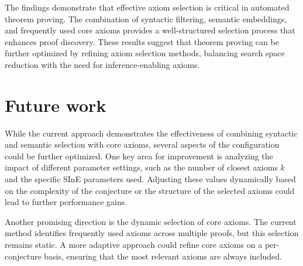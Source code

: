\documentclass[english,version-2020-11]{uzl-thesis}
\begin{document}
The findings demonstrate that effective axiom selection is critical in automated theorem proving. The combination of syntactic filtering, semantic embeddings, and frequently used core axioms provides a well-structured selection process that enhances proof discovery. These results suggest that theorem proving can be further optimized by refining axiom selection methods, balancing search space reduction with the need for inference-enabling axioms.

\chapter{Future work}
\label{chapter-futerwork}

While the current approach demonstrates the effectiveness of combining syntactic and semantic selection with core axioms, several aspects of the configuration could be further optimized. One key area for improvement is analyzing the impact of different parameter settings, such as the number of closest axioms \( k \) and the specific SInE parameters used. Adjusting these values dynamically based on the complexity of the conjecture or the structure of the selected axioms could lead to further performance gains.

Another promising direction is the dynamic selection of core axioms. The current method identifies frequently used axioms across multiple proofs, but this selection remains static. A more adaptive approach could refine core axioms on a per-conjecture basis, ensuring that the most relevant axioms are always included.



%
\end{document}
